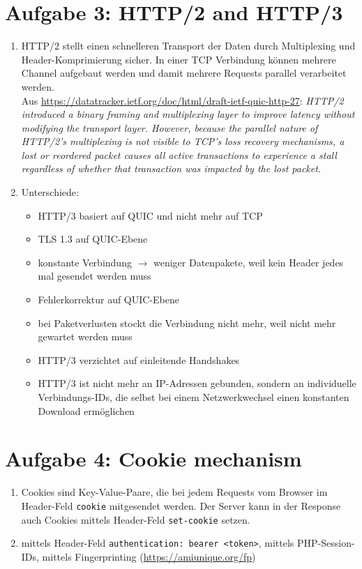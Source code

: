 \documentclass{article}
\begin{document}
	\section*{Aufgabe 3: HTTP/2 and HTTP/3}
	\begin{enumerate}[label=(\alph*)]
		\item HTTP/2 stellt einen schnelleren Transport der Daten durch Multiplexing und Header-Komprimierung sicher. In einer TCP Verbindung können mehrere Channel aufgebaut werden und damit mehrere Requests parallel verarbeitet werden. \\
		Aus \url{https://datatracker.ietf.org/doc/html/draft-ietf-quic-http-27}: \textit{HTTP/2 introduced a binary framing and multiplexing layer to improve latency without modifying the transport layer.  However, because the parallel nature of HTTP/2's multiplexing is not visible to TCP's loss recovery mechanisms, a lost or reordered packet causes all active transactions to experience a stall regardless of whether that transaction was impacted by the lost packet.}
		\item  Unterschiede:
		\begin{itemize}
			\item HTTP/3 basiert auf QUIC und nicht mehr auf TCP
			\item TLS 1.3 auf QUIC-Ebene
			\item konstante Verbindung $\to$ weniger Datenpakete, weil kein Header jedes mal gesendet werden muss
			\item Fehlerkorrektur auf QUIC-Ebene
			\item bei Paketverlusten stockt die Verbindung nicht mehr, weil nicht mehr gewartet werden muss
			\item HTTP/3 verzichtet auf einleitende Handshakes
			\item HTTP/3 ist nicht mehr an IP-Adressen gebunden, sondern an individuelle Verbindungs-IDs, die selbst bei einem Netzwerkwechsel einen konstanten Download ermöglichen
		\end{itemize}
	\end{enumerate}
	
	\section*{Aufgabe 4: Cookie mechanism}
	\begin{enumerate}[label=(\alph*)]
		\item Cookies sind Key-Value-Paare, die bei jedem Requests vom Browser im Header-Feld \texttt{cookie} mitgesendet werden. Der Server kann in der Response auch Cookies mittels Header-Feld \texttt{set-cookie} setzen.
		\item mittels Header-Feld \texttt{authentication: bearer <token>}, mittels PHP-Session-IDs, mittels Fingerprinting (\url{https://amiunique.org/fp})
	\end{enumerate}
\end{document}
